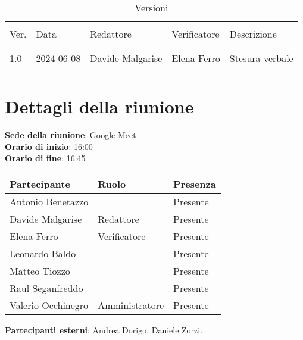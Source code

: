 \documentclass[italian,12pt]{article}
\begin{document}


\newpage



\begin{table}[!h]
	\caption{Versioni}
	\footnotesize
	\begin{center}
		\begin{tabular}{ l l l l p{6cm} }
			\hline                                                                              \\[-2ex]
			Ver. & Data       & Redattore          & Verificatore       & Descrizione           \\
			\\[-2ex] \hline \\[-1.5ex]
			1.0  & 2024-06-08 & Davide Malgarise    & Elena Ferro & Stesura verbale \\
			\\[-1.5ex] \hline
		\end{tabular}
	\end{center}
\end{table}

\newpage

\tableofcontents

\newpage

\section{Dettagli della riunione}


\textbf{Sede della riunione}: Google Meet\\
\textbf{Orario di inizio}: 16:00\\
\textbf{Orario di fine}: 16:45\\

\begin{flushleft}
	\begin{table}[!h]
	\begin{tabular}{ |l|l|l| } 
		\hline
		\textbf{Partecipante} & \textbf{Ruolo}       & \textbf{Presenza} \\
		\hline 
		Antonio Benetazzo     &                      & Presente          \\
		Davide Malgarise      & Redattore            & Presente          \\
		Elena Ferro           & Verificatore         & Presente          \\
		Leonardo Baldo        &                      & Presente          \\
		Matteo Tiozzo         &                      & Presente          \\
		Raul Seganfreddo      &  					 & Presente          \\
		Valerio Occhinegro    & Amministratore       & Presente          \\
		\hline
	\end{tabular}
	\end{table}
	\textbf{Partecipanti esterni}: Andrea Dorigo, Daniele Zorzi.\\
\end{flushleft}
\end{document}

